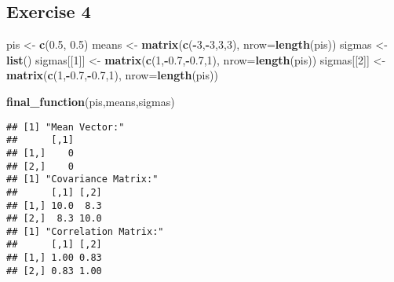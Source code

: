 \documentclass[]{article}
\newenvironment{Shaded}{\begin{snugshade}}{\end{snugshade}}
\newcommand{\DataTypeTok}[1]{\textcolor[rgb]{0.13,0.29,0.53}{#1}}
\newcommand{\DecValTok}[1]{\textcolor[rgb]{0.00,0.00,0.81}{#1}}
\newcommand{\FloatTok}[1]{\textcolor[rgb]{0.00,0.00,0.81}{#1}}
\newcommand{\KeywordTok}[1]{\textcolor[rgb]{0.13,0.29,0.53}{\textbf{#1}}}
\newcommand{\NormalTok}[1]{#1}
\newcommand{\OperatorTok}[1]{\textcolor[rgb]{0.81,0.36,0.00}{\textbf{#1}}}
\newcommand{\StringTok}[1]{\textcolor[rgb]{0.31,0.60,0.02}{#1}}
\begin{document}
\hypertarget{exercise-4}{%
\subsection{Exercise 4}\label{exercise-4}}

\begin{Shaded}
\begin{Highlighting}[]
\NormalTok{pis <-}\StringTok{ }\KeywordTok{c}\NormalTok{(}\FloatTok{0.5}\NormalTok{, }\FloatTok{0.5}\NormalTok{)}
\NormalTok{means <-}\StringTok{ }\KeywordTok{matrix}\NormalTok{(}\KeywordTok{c}\NormalTok{(}\OperatorTok{-}\DecValTok{3}\NormalTok{,}\OperatorTok{-}\DecValTok{3}\NormalTok{,}\DecValTok{3}\NormalTok{,}\DecValTok{3}\NormalTok{), }\DataTypeTok{nrow=}\KeywordTok{length}\NormalTok{(pis))}
\NormalTok{sigmas <-}\StringTok{ }\KeywordTok{list}\NormalTok{()}
\NormalTok{sigmas[[}\DecValTok{1}\NormalTok{]] <-}\StringTok{ }\KeywordTok{matrix}\NormalTok{(}\KeywordTok{c}\NormalTok{(}\DecValTok{1}\NormalTok{,}\OperatorTok{-}\FloatTok{0.7}\NormalTok{,}\OperatorTok{-}\FloatTok{0.7}\NormalTok{,}\DecValTok{1}\NormalTok{), }\DataTypeTok{nrow=}\KeywordTok{length}\NormalTok{(pis))}
\NormalTok{sigmas[[}\DecValTok{2}\NormalTok{]] <-}\StringTok{ }\KeywordTok{matrix}\NormalTok{(}\KeywordTok{c}\NormalTok{(}\DecValTok{1}\NormalTok{,}\OperatorTok{-}\FloatTok{0.7}\NormalTok{,}\OperatorTok{-}\FloatTok{0.7}\NormalTok{,}\DecValTok{1}\NormalTok{), }\DataTypeTok{nrow=}\KeywordTok{length}\NormalTok{(pis))}
\end{Highlighting}
\end{Shaded}

\begin{Shaded}
\begin{Highlighting}[]
\KeywordTok{final_function}\NormalTok{(pis,means,sigmas)}
\end{Highlighting}
\end{Shaded}

\begin{verbatim}
## [1] "Mean Vector:"
##      [,1]
## [1,]    0
## [2,]    0
## [1] "Covariance Matrix:"
##      [,1] [,2]
## [1,] 10.0  8.3
## [2,]  8.3 10.0
## [1] "Correlation Matrix:"
##      [,1] [,2]
## [1,] 1.00 0.83
## [2,] 0.83 1.00
\end{verbatim}
\end{document}
